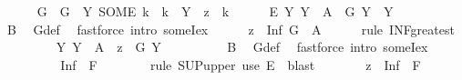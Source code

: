 \begin{isabellebody}
\isanewline
\ \ \ \ \isamarkupfalse%
\ G\ \ {\isachardoublequoteopen}G\ {\isasymequiv}\ {\isasymlambda}Y{\isachardot}{\kern0pt}\ SOME\ k\ {\isachardot}{\kern0pt}\ k\ {\isasymin}\ Y\ {\isasymand}\ z\ {\isacharless}{\kern0pt}\ k{\isachardoublequoteclose}\isanewline
\ \ \ \ \isamarkupfalse%
\ E{\isacharcolon}{\kern0pt}\ {\isachardoublequoteopen}{\isasymAnd}Y{\isachardot}{\kern0pt}\ Y\ {\isasymin}\ A\ {\isasymLongrightarrow}\ G\ Y\ {\isasymin}\ Y{\isachardoublequoteclose}\isanewline
\ \ \ \ \ \ \isamarkupfalse%
\ B\ \isamarkupfalse%
\ G{\isacharunderscore}{\kern0pt}def\ \isamarkupfalse%
\ {\isacharparenleft}{\kern0pt}fastforce\ intro{\isacharcolon}{\kern0pt}\ someI{}{\isacharunderscore}{\kern0pt}ex{\isacharparenright}{\kern0pt}\isanewline
\ \ \ \ \isamarkupfalse%
\ {\isachardoublequoteopen}z\ {\isasymle}\ Inf\ {\isacharparenleft}{\kern0pt}G\ {\isacharbackquote}{\kern0pt}\ A{\isacharparenright}{\kern0pt}{\isachardoublequoteclose}\isanewline
\ \ \ \ \isamarkupfalse%
\ {\isacharparenleft}{\kern0pt}rule\ INF{\isacharunderscore}{\kern0pt}greatest{\isacharparenright}{\kern0pt}\isanewline
\ \ \ \ \ \ \isamarkupfalse%
\ \ {\isachardoublequoteopen}{\isasymAnd}Y{\isachardot}{\kern0pt}\ Y\ {\isasymin}\ A\ {\isasymLongrightarrow}\ z\ {\isasymle}\ G\ Y{\isachardoublequoteclose}\isanewline
\ \ \ \ \ \ \ \ \isamarkupfalse%
\ B\ \isamarkupfalse%
\ G{\isacharunderscore}{\kern0pt}def\ \isamarkupfalse%
\ {\isacharparenleft}{\kern0pt}fastforce\ intro{\isacharcolon}{\kern0pt}\ someI{}{\isacharunderscore}{\kern0pt}ex{\isacharparenright}{\kern0pt}\isanewline
\ \ \ \ \isamarkupfalse%
\isanewline
\ \ \ \ \isamarkupfalse%
\ \isamarkupfalse%
\ {\isachardoublequoteopen}{\isachardot}{\kern0pt}{\isachardot}{\kern0pt}{\isachardot}{\kern0pt}\ {\isasymle}\ {\isasymSqunion}{\isacharparenleft}{\kern0pt}Inf\ {\isacharbackquote}{\kern0pt}\ {\isacharquery}{\kern0pt}F{\isacharparenright}{\kern0pt}{\isachardoublequoteclose}\isanewline
\ \ \ \ \ \ \isamarkupfalse%
\ {\isacharparenleft}{\kern0pt}rule\ SUP{\isacharunderscore}{\kern0pt}upper{\isacharparenright}{\kern0pt}\ {\isacharparenleft}{\kern0pt}use\ E\ \ blast{\isacharparenright}{\kern0pt}\isanewline
\ \ \ \ \isamarkupfalse%
\ \isamarkupfalse%
\ {\isachardoublequoteopen}z\ {\isasymle}\ {\isasymSqunion}{\isacharparenleft}{\kern0pt}Inf\ {\isacharbackquote}{\kern0pt}\ {\isacharquery}{\kern0pt}F{\isacharparenright}{\kern0pt}{\isachardoublequoteclose}\isanewline

\end{isabellebody}
